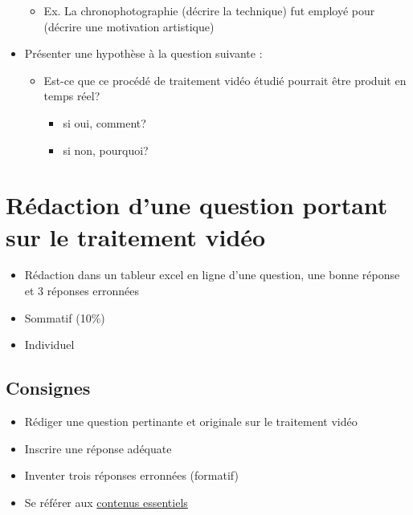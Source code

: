 \documentclass[
]{book}
\providecommand{\tightlist}{%
  \setlength{\itemsep}{0pt}\setlength{\parskip}{0pt}}
\begin{document}
\begin{itemize}
  \begin{itemize}
  \tightlist
  \item
    Ex. La chronophotographie (décrire la technique) fut employé pour (décrire une motivation artistique)
  \end{itemize}
\item
  Présenter une hypothèse à la question suivante :

  \begin{itemize}
  \tightlist
  \item
    Est-ce que ce procédé de traitement vidéo étudié pourrait être produit en temps réel?

    \begin{itemize}
    \tightlist
    \item
      si oui, comment?
    \item
      si non, pourquoi?
    \end{itemize}
  \end{itemize}
\end{itemize}

\hypertarget{sommatif_2}{%
\section{Rédaction d'une question portant sur le traitement vidéo}\label{sommatif_2}}

\begin{itemize}
\tightlist
\item
  Rédaction dans un tableur excel en ligne d'une question, une bonne réponse et 3 réponses erronnées\\
\item
  Sommatif (10\%)
\item
  Individuel
\end{itemize}

\hypertarget{consignes-1}{%
\subsection{Consignes}\label{consignes-1}}

\begin{itemize}
\tightlist
\item
  Rédiger une question pertinante et originale sur le traitement vidéo
\item
  Inscrire une réponse adéquate
\item
  Inventer trois réponses erronnées (formatif)
\item
  Se référer aux \href{}{contenus essentiels}
\end{itemize}
\end{document}
